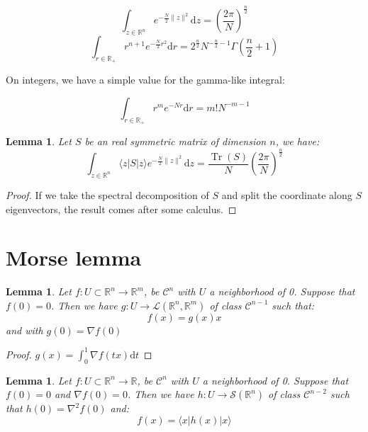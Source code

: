 \documentclass[10pt,a4paper]{report}
\theoremstyle{plain}
\newtheorem{lem}[thm]{Lemma}
\theoremstyle{definition}
\theoremstyle{remark}
\newcommand{\R}{\ensuremath{\mathbb{R}}}
\newcommand{\ket}[1]{|#1\rangle}
\newcommand{\bra}[1]{\langle#1|}
\newcommand{\dd}{\mathrm{d}}
\DeclareMathOperator{\Tr}{Tr}
\newcommand{\class}[1]{{\mathscr{C}^{#1}}}
\begin{document}
\begin{equation}\label{eqn:gaussdimn}
  \int_{z \in\R^n} e^{-\frac N2 \|z\|^2} \dd z = {\left(\frac
      {2\pi}{N}\right)}^{\frac n 2}
\end{equation}
\begin{equation}\label{eqn:gausspown}
  \int_{r \in\R_+} r^{n+1} e^{-\frac N2 r^2} \dd r = 2^{\frac n2}N^{-\frac n2
    -1}\Gamma\left(\frac n 2 + 1\right)
\end{equation}

On integers, we have a simple value for the gamma-like integral:

\begin{equation}\label{eqn:gamma}
  \int_{r \in\R_+} r^{m} e^{- N r} \dd r = m! N^{-m-1}
\end{equation}



\begin{lem}\label{lem:gausssymtr}
  Let $S$ be an real symmetric matrix of dimension $n$, we have:
  \[\int_{z \in \R^n} \bra z S \ket z e^{-\frac N 2 \|z\|^2} \dd z =
    \frac{\Tr(S)}N {\left(\frac
        {2\pi}{N}\right)}^{\frac n 2} \]
\end{lem}
\begin{proof} If we take the spectral decomposition of $S$ and split the
  coordinate along $S$ eigenvectors, the result comes after some calculus.
\end{proof}

\section{Morse lemma}

\begin{lem}\label{lem:dec}
  Let $f : U \subset \R^n \to \R^m$, be $\class{n}$ with $U$ a neighborhood of 0.
  Suppose that $f(0) = 0$. Then we have $g : U \to \mathcal{L}(\R^n,\R^m)$ of
  class $\class {n-1}$ such
  that:
  \[f(x) = g(x) x\]
  and with $g(0) = \nabla f(0)$
\end{lem}

\begin{proof}
  $g(x) = \int_0^1 \nabla f(tx) \dd t$
\end{proof}

\begin{lem}\label{lem:dec2}
  Let $f : U \subset \R^n \to \R$, be $\class{n}$ with $U$ a neighborhood of 0.
  Suppose that $f(0) = 0$ and $\nabla f(0) = 0$.
  Then we have $h : U \to \mathcal{S}(\R^n)$ of class
  $\class {n-2}$ such
  that $h(0) = \nabla^2 f(0)$ and:
  \[f(x) = \bra x h(x) \ket x\]
\end{lem}
\end{document}
